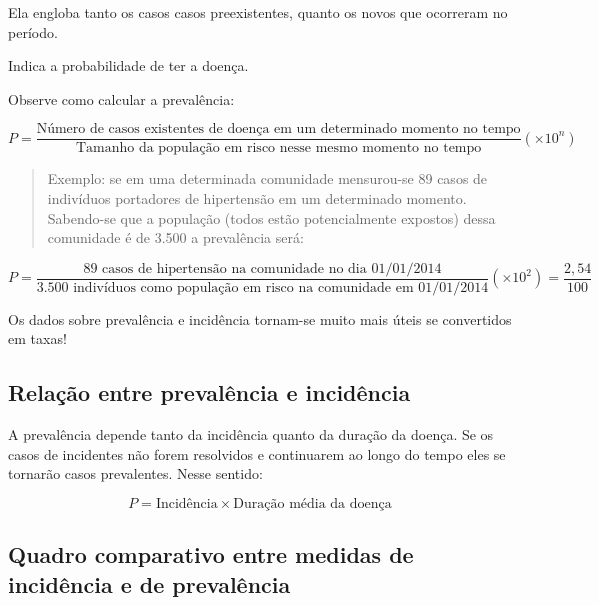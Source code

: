 \documentclass[
]{book}
\begin{document}
\hfill\break

Ela engloba tanto os casos casos preexistentes, quanto os novos que ocorreram no período.

\hfill\break

Indica a probabilidade de ter a doença.

\hfill\break

Observe como calcular a prevalência:

\hfill\break

\[
P=\frac{\text{Número de  casos existentes de doença em um determinado momento no tempo}}{\text{Tamanho da população em risco nesse mesmo momento no tempo}} (\times 10^{n})
\]

\hfill\break

\begin{quote}
Exemplo: se em uma determinada comunidade mensurou-se 89 casos de indivíduos portadores de hipertensão em um determinado momento. Sabendo-se que a população (todos estão potencialmente expostos) dessa comunidade é de 3.500 a prevalência será:
\end{quote}

\hfill\break

\[
P=\frac{\text{89 casos de hipertensão na comunidade no dia 01/01/2014}}{\text{3.500 indivíduos como população em risco na comunidade em 01/01/2014}} (\times 10^{2}) = \frac{2,54}{100 }
\]

\hfill\break

Os dados sobre prevalência e incidência tornam-se muito mais úteis se convertidos em taxas!

\hfill\break

\hypertarget{relauxe7uxe3o-entre-prevaluxeancia-e-inciduxeancia}{%
\subsection{Relação entre prevalência e incidência}\label{relauxe7uxe3o-entre-prevaluxeancia-e-inciduxeancia}}

\hfill\break

A prevalência depende tanto da incidência quanto da duração da doença. Se os casos de incidentes não forem resolvidos e continuarem ao longo do tempo eles se tornarão casos prevalentes. Nesse sentido:

\hfill\break

\[
P=\text{Incidência} \times \text{Duração média da doença}
\]

\hfill\break

\hypertarget{quadro-comparativo-entre-medidas-de-inciduxeancia-e-de-prevaluxeancia}{%
\subsection{Quadro comparativo entre medidas de incidência e de prevalência}\label{quadro-comparativo-entre-medidas-de-inciduxeancia-e-de-prevaluxeancia}}
\end{document}
